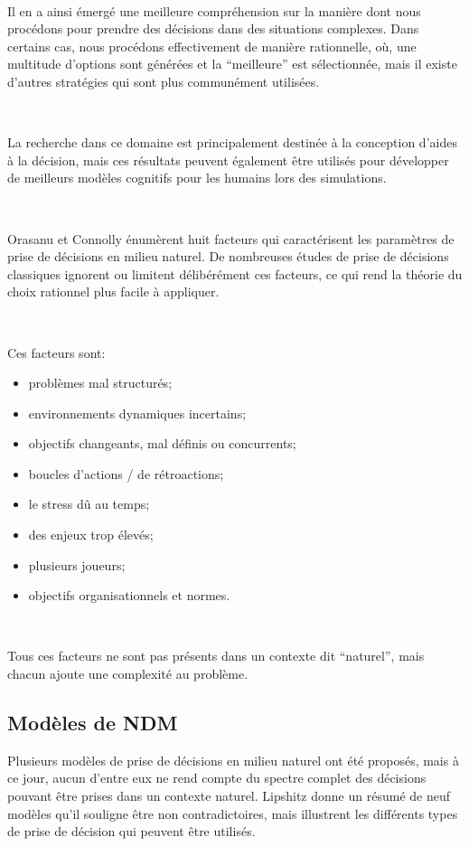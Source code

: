 ~\par
Il en a ainsi émergé une meilleure compréhension sur la manière dont nous procédons pour prendre des décisions dans des situations complexes. Dans certains cas, nous procédons effectivement de manière rationnelle, où, une multitude d’options sont générées et la “meilleure” est sélectionnée, mais il existe d’autres stratégies qui sont plus communément utilisées.

~\par
La recherche dans ce domaine est principalement destinée à la conception d’aides à la décision, mais ces résultats peuvent également être utilisés pour développer de meilleurs modèles cognitifs pour les humains lors des simulations.

~\par
Orasanu et Connolly \parencite{orasanu1993reinvention} énumèrent huit facteurs qui caractérisent les paramètres de prise de décisions en milieu naturel. De nombreuses études de prise de décisions classiques ignorent ou limitent délibérément ces facteurs, ce qui rend la théorie du choix rationnel plus facile à appliquer.

~\par

Ces facteurs sont:
\begin{itemize}
\item problèmes mal structurés;
\item environnements dynamiques incertains;
\item objectifs changeants, mal définis ou concurrents;
\item boucles d'actions / de rétroactions;
\item le stress dû au temps;
\item des enjeux trop élevés;
\item plusieurs joueurs;
\item objectifs organisationnels et normes.
\end{itemize}

~\par
Tous ces facteurs ne sont pas présents dans un contexte dit “naturel”, mais chacun ajoute une complexité au problème.


\subsection{Modèles de NDM}

Plusieurs modèles de prise de décisions en milieu naturel ont été proposés, mais à ce jour,
aucun d’entre eux ne rend compte du spectre complet des décisions pouvant être prises dans un contexte naturel. Lipshitz \parencite{lipshitz1993converging} donne un résumé de neuf modèles qu’il souligne être non contradictoires, mais illustrent les différents types de prise de décision qui peuvent être utilisés.

